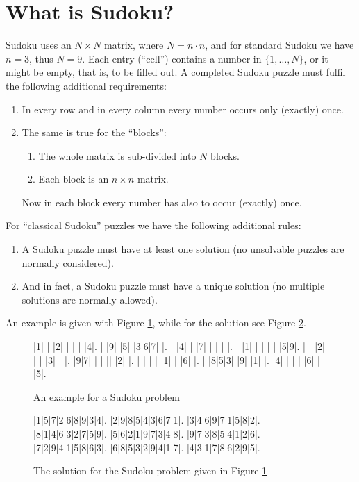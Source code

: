 \documentclass[11pt]{report}
\begin{document}
\section{What is Sudoku?}
\label{sec:whatissudoku}

Sudoku uses an $N \times N$ matrix, where $N = n \cdot n$, and for standard Sudoku we have $n = 3$, thus $N = 9$. Each entry (``cell'') contains a number in $\{1, \dots, N\}$, or it might be empty, that is, to be filled out. A completed Sudoku puzzle must fulfil the following additional requirements:
\begin{enumerate}
\item In every row and in every column every number occurs only (exactly) once.
\item The same is true for the ``blocks'':
\begin{enumerate}
\item The whole matrix is sub-divided into $N$ blocks.
\item Each block is an $n \times n$ matrix.
\end{enumerate}
Now in each block every number has also to occur (exactly) once.
\end{enumerate}
For ``classical Sudoku'' puzzles we have the following additional rules:
\begin{enumerate}
\item A Sudoku puzzle must have at least one solution (no unsolvable puzzles are normally considered).
\item And in fact, a Sudoku puzzle must have a unique solution (no multiple solutions are normally allowed).
\end{enumerate}
An example is given with Figure \ref{sudokuEx}, while for the solution see Figure \ref{fig:solutionsudokuEx}.

\begin{figure}[h]
\begin{sudoku}
 |1| | |2| | | | |4|.
 | |9| |5| |3|6|7| |.
 | |4| | |7| | | | |.
 | |1| | | | | |5|9|.
 | | |2| | | |3| | |.
 |9|7| | | || |2| |.
 | | | | |1| | |6| |.
 | |8|5|3| |9| |1| |.
 |4| | | | |6| | |5|.
\end{sudoku}
\caption{An example for a Sudoku problem}
\label{sudokuEx}
\end{figure}

\begin{figure}[h]
\begin{sudoku}
  |1|5|7|2|6|8|9|3|4|.
  |2|9|8|5|4|3|6|7|1|.
  |3|4|6|9|7|1|5|8|2|.
  |8|1|4|6|3|2|7|5|9|.
  |5|6|2|1|9|7|3|4|8|.
  |9|7|3|8|5|4|1|2|6|.
  |7|2|9|4|1|5|8|6|3|.
  |6|8|5|3|2|9|4|1|7|.
  |4|3|1|7|8|6|2|9|5|.
\end{sudoku}
\caption{The solution for the Sudoku problem given in Figure \ref{sudokuEx}}
\label{fig:solutionsudokuEx}
\end{figure}
\end{document}
